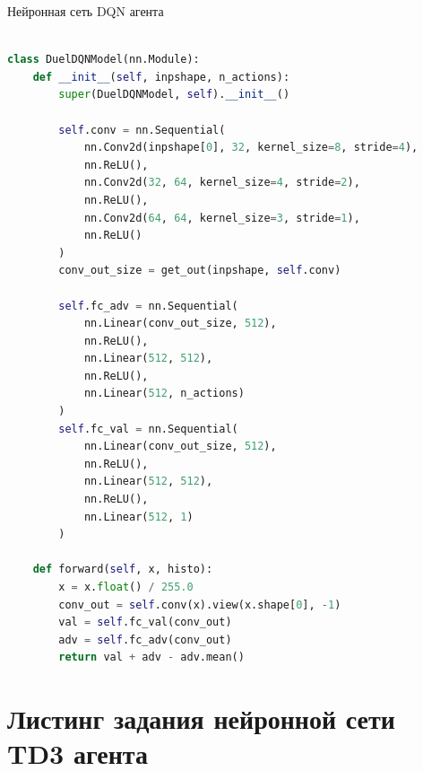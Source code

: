\begin{ListingEnv}[!h]
\captiondelim{ }
\caption{Нейронная сеть DQN агента}\label{lst:dqn}

\begin{lstlisting}[language=Python]

class DuelDQNModel(nn.Module):
    def __init__(self, inpshape, n_actions):
        super(DuelDQNModel, self).__init__()
        
        self.conv = nn.Sequential(
            nn.Conv2d(inpshape[0], 32, kernel_size=8, stride=4),
            nn.ReLU(),
            nn.Conv2d(32, 64, kernel_size=4, stride=2),
            nn.ReLU(),
            nn.Conv2d(64, 64, kernel_size=3, stride=1),
            nn.ReLU()
        )
        conv_out_size = get_out(inpshape, self.conv)

        self.fc_adv = nn.Sequential(
            nn.Linear(conv_out_size, 512),
            nn.ReLU(),
            nn.Linear(512, 512),
            nn.ReLU(),
            nn.Linear(512, n_actions)
        )
        self.fc_val = nn.Sequential(
            nn.Linear(conv_out_size, 512),
            nn.ReLU(),
            nn.Linear(512, 512),
            nn.ReLU(),
            nn.Linear(512, 1)
        )

    def forward(self, x, histo):
        x = x.float() / 255.0
        conv_out = self.conv(x).view(x.shape[0], -1)
        val = self.fc_val(conv_out)
        adv = self.fc_adv(conv_out)
        return val + adv - adv.mean()
\end{lstlisting}
\end{ListingEnv}

\section{Листинг задания нейронной сети TD3 агента}\label{app:A5}

